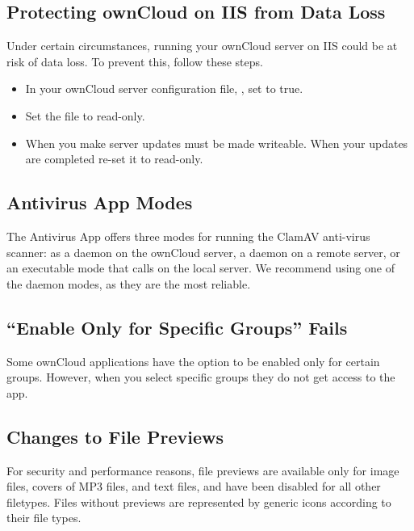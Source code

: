 \documentclass[letterpaper,10pt,english]{sphinxmanual}
\begin{document}
\subsection{Protecting ownCloud on IIS from Data Loss}
\label{release_notes:protecting-owncloud-on-iis-from-data-loss}
Under certain circumstances, running your ownCloud server on IIS could be at
risk of data loss. To prevent this, follow these steps.
\begin{itemize}
\item {} 
In your ownCloud server configuration file, , set
 to true.

\item {} 
Set the  file to read-only.

\item {} 
When you make server updates  must be made writeable. When your
updates are completed re-set it to read-only.

\end{itemize}


\subsection{Antivirus App Modes}
\label{release_notes:antivirus-app-modes}
The Antivirus App offers three modes for running the ClamAV anti-virus scanner:
as a daemon on the ownCloud server, a daemon on a remote server, or an
executable mode that calls  on the local server. We recommend using
one of the daemon modes, as they are the most reliable.


\subsection{``Enable Only for Specific Groups'' Fails}
\label{release_notes:enable-only-for-specific-groups-fails}
Some ownCloud applications have the option to be enabled only for certain
groups. However, when you select specific groups they do not get access to the
app.


\subsection{Changes to File Previews}
\label{release_notes:changes-to-file-previews}
For security and performance reasons, file previews are available only for
image files, covers of MP3 files, and text files, and have been disabled for
all other filetypes. Files without previews are represented by generic icons
according to their file types.
\end{document}
